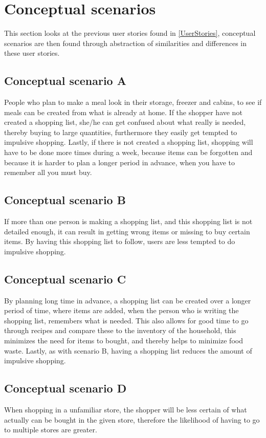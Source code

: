 \section{Conceptual scenarios} \label{conceptualScenarios}
This section looks at the previous user stories found in \cref{UserStories}, conceptual scenarios are then found through abstraction of similarities and differences in these user stories.

\subsection{Conceptual scenario A}
People who plan to make a meal look in their storage, freezer and cabins, to see if meals can be created from what is already at home. If the shopper have not created a shopping list, she/he can get confused about what really is needed, thereby buying to large quantities, furthermore they easily get tempted to impulsive shopping. Lastly, if there is not created a shopping list, shopping will have to be done more times during a week, because items can be forgotten and because it is harder to plan a longer period in advance, when you have to remember all you must buy.

\subsection{Conceptual scenario B}
If more than one person is making a shopping list, and this shopping list is not detailed enough, it can result in getting wrong items or missing to buy certain items. By having this shopping list to follow, users are less tempted to do impulsive shopping.

\subsection{Conceptual scenario C}
By planning long time in advance, a shopping list can be created over a longer period of time, where items are added, when the person who is writing the shopping list, remembers what is needed. This also allows for good time to go through recipes and compare these to the inventory of the household, this minimizes the need for items to bought, and thereby helps to minimize food waste. Lastly, as with scenario B, having a shopping list reduces the amount of impulsive shopping.

\subsection{Conceptual scenario D}
When shopping in a unfamiliar store, the shopper will be less certain of what actually can be bought in the given store, therefore the likelihood of having to go to multiple stores are greater.